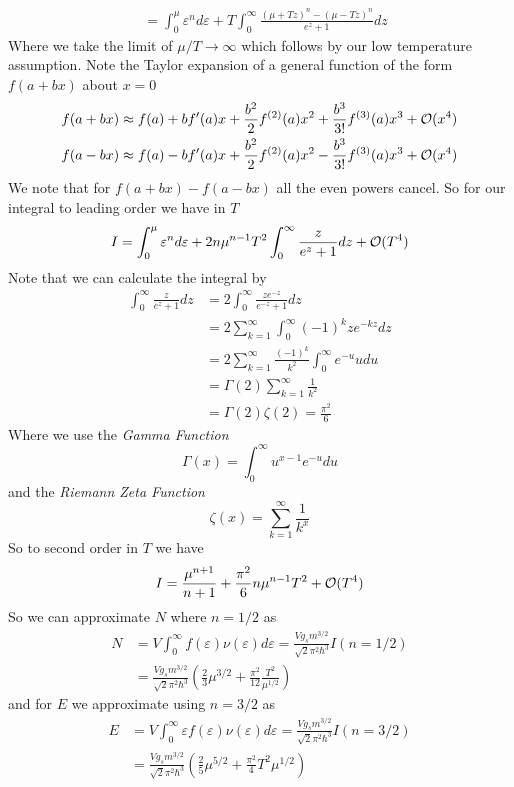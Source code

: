 \documentclass[11pt]{article}
\numberwithin{equation}{section}
\begin{document}
\begin{enumerate}[(1)]
\begin{align*}
&= \int_{0}^{\mu}\varepsilon^{n}d\varepsilon + T\int_{0}^{\infty}\frac{(\mu+Tz)^{n}-(\mu-Tz)^{n}}{e^{z}+1}dz
\end{align*}
Where we take the limit of $\mu/T\rightarrow\infty$ which follows by our low temperature 
assumption. Note the Taylor expansion of a general function of the form $f(a+bx)$ about $x=0$
\begin{align*}
f(a+bx) &\approx f(a) + bf'(a)x + \frac{b^2}{2}f^{(2)}(a)x^2 + \frac{b^3}{3!}f^{(3)}(a)x^3 + \mathcal{O}{(x^4)}\\
f(a-bx) &\approx f(a) - bf'(a)x + \frac{b^2}{2}f^{(2)}(a)x^2 - \frac{b^3}{3!}f^{(3)}(a)x^3 + \mathcal{O}{(x^4)}
\end{align*}
We note that for $f(a+bx)-f(a-bx)$ all the even powers cancel. So for our integral to leading
order we have in $T$
$$I = \int_{0}^{\mu}\varepsilon^{n}d\varepsilon + 2n\mu^{n-1}T^2\int_{0}^{\infty}\frac{z}{e^{z}+1}dz +\mathcal{O}{(T^4)}$$
Note that we can calculate the integral by 
\begin{align*}
\int_{0}^{\infty}\frac{z}{e^{z}+1}dz &= 2\int_{0}^{\infty}\frac{ze^{-z}}{e^{-z}+1}dz \\
&= 2\sum_{k=1}^{\infty}\int_{0}^{\infty}(-1)^kze^{-kz}dz\\
&= 2\sum_{k=1}^{\infty}\frac{(-1)^{k}}{k^2}\int_{0}^{\infty}e^{-u}udu\\
&= \Gamma(2)\sum_{k=1}^{\infty}\frac{1}{k^2}\\
&= \Gamma(2)\zeta(2) = \frac{\pi^2}{6}
\end{align*}
Where we use the \emph{Gamma Function}
$$\Gamma(x) = \int_{0}^{\infty}u^{x-1}e^{-u}du$$
and the \emph{Riemann Zeta Function}
$$\zeta(x) = \sum_{k=1}^{\infty}\frac{1}{k^{x}}$$
So to second order in $T$ we have
$$I = \frac{\mu^{n+1}}{n+1} + \frac{\pi^2}{6}n\mu^{n-1}T^2 +\mathcal{O}{(T^4)}$$
So we can approximate $N$ where $n=1/2$ as
\begin{align*}
N &= V\int_{0}^{\infty}f(\varepsilon)\nu(\varepsilon)d\varepsilon = \frac{Vg_sm^{3/2}}{\sqrt{2}\pi^2\hbar^3}I(n=1/2)\\
&= \frac{Vg_sm^{3/2}}{\sqrt{2}\pi^2\hbar^3}\left(\frac{2}{3}\mu^{3/2}+\frac{\pi^2}{12}\frac{T^2}{\mu^{1/2}}\right)
\end{align*}
and for $E$ we approximate using $n=3/2$ as
\begin{align*}
E &= V\int_{0}^{\infty}{\varepsilon}f(\varepsilon)\nu(\varepsilon)d\varepsilon = \frac{Vg_sm^{3/2}}{\sqrt{2}\pi^2\hbar^3}I(n=3/2)\\
&= \frac{Vg_sm^{3/2}}{\sqrt{2}\pi^2\hbar^3}\left(\frac{2}{5}\mu^{5/2}+\frac{\pi^2}{4}T^2\mu^{1/2}\right)

\end{align*}
\end{enumerate}
\end{document}
